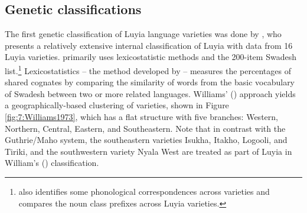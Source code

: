 \documentclass[output=paper]{langscibook}
\begin{document}
\subsection{Genetic classifications \citep{mould_comparative_1976,mould_greater_1981,williams_lexico-statistical_1973,nurse_bantu_1980}}
\label{sec:2.2:Genetic_classifications}

The first genetic classification of Luyia language varieties was done by \citet{williams_lexico-statistical_1973}, who presents a relatively extensive internal classification of Luyia with data from 16 Luyia varieties. \citet{williams_lexico-statistical_1973} primarily uses lexicostatistic methods and the 200-item Swadesh list.\footnote{\citet{williams_lexico-statistical_1973} also identifies some phonological correspondences across varieties and compares the noun class prefixes across Luyia varieties.} Lexicostatistics -- the method developed by \citet{swadesh-1952-lexicostatistic-dating} -- measures the percentages of shared cognates by comparing the similarity of words from the basic vocabulary of Swadesh between two or more related languages. Williams' (\citeyear{williams_lexico-statistical_1973}) approach yields a geographically-based clustering of varieties, shown in Figure \ref{fig:7:Williams1973}, which has a flat structure with five branches: Western, Northern, Central, Eastern, and Southeastern. Note that in contrast with the Guthrie/Maho system, the southeastern varieties Isukha, Itakho, Logooli, and Tiriki, and the southwestern variety Nyala West are treated as part of Luyia in William's (\citeyear{williams_lexico-statistical_1973}) classification.
\end{document}
